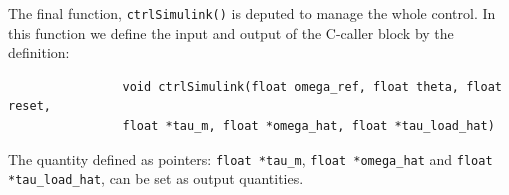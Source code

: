 \documentclass[11pt,a4paper,oneside]{book}
\numberwithin{equation}{section}
\theoremstyle{it}
\theoremstyle{definition}
\begin{document}
	The final function, \texttt{ctrlSimulink()} is deputed to manage the whole control. In this function we define the input and output of the C-caller block by the definition: 
	\begin{mybox}
		{\selectfont \footnotesize \noindent
			\begin{verbatim}
				void ctrlSimulink(float omega_ref, float theta, float reset, 
				float *tau_m, float *omega_hat, float *tau_load_hat)
		\end{verbatim}}
	\end{mybox}
	The quantity defined as pointers: \texttt{float *tau\_m}, \texttt{float *omega\_hat} and \texttt{float *tau\_load\_hat}, can be set as output quantities.
\end{document}
